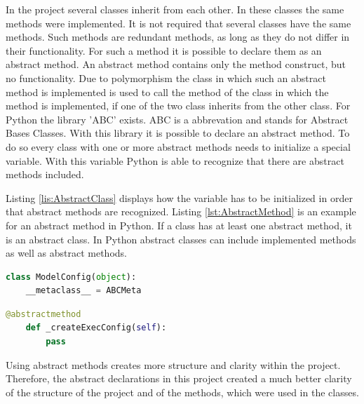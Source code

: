 In the project several classes inherit from each other. In these classes the same methods were implemented. It is not required that several classes have the same methods. Such methods are redundant methods, as long as they do not differ in their functionality. For such a method it is possible to declare them as an abstract method. An abstract method contains only the method construct, but no functionality. Due to polymorphism the class in which such an abstract method is implemented is used to call the method of the class in which the method is implemented, if one of the two class inherits from the other class. \newline
For Python the library 'ABC' exists. ABC is a abbrevation and stands for Abstract Bases Classes. With this library it is possible to declare an abstract method. To do so every class with one or more abstract methods needs to initialize a special variable. With this variable Python is able to recognize that there are abstract methods included. 

Listing \ref{lis:AbstractClass} displays how the variable has to be initialized in order that abstract methods are recognized. Listing \ref{lst:AbstractMethod} is an example for an abstract method in Python. If a class has at least one abstract method, it is an abstract class. In Python abstract classes can include implemented methods as well as abstract methods.

\begin{lstlisting}[language=Python, caption ={[Initialization of an class variable in order to use the library ABC] The initialization of a class variable which is required by Python in order to detect abstract methods and abstract classes.}, label = lis:AbstractClass]
class ModelConfig(object):
    __metaclass__ = ABCMeta
\end{lstlisting} 

\begin{lstlisting}[language=Python, caption ={[Declaration of an abstract method] Declaration of an abstract method.}, label=lst:AbstractMethod]
    @abstractmethod
    def _createExecConfig(self):
        pass
\end{lstlisting}
Using abstract methods creates more structure and clarity within the project. Therefore, the abstract declarations in this project created a much better clarity of the structure of the project and of the methods, which were used in the classes.

